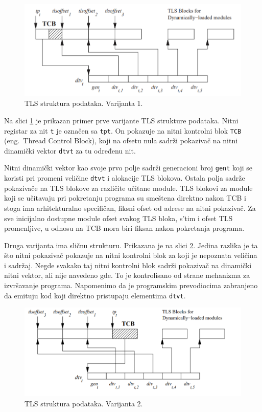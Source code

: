 \documentclass[12pt,oneside]{memoir}
\begin{document}
\begin{figure}[h!]
	\begin{center}
		\includegraphics[scale=0.6]{slike/TLSModelV1.png}
	\end{center}
	\caption{TLS struktura podataka. Varijanta 1.}
	\label{fig:tls_model1}
\end{figure}

Na slici \ref{fig:tls_model1} je prikazan primer prve varijante TLS strukture podataka. Nitni registar za nit \texttt{t} je označen sa \texttt{tpt}. On pokazuje na nitni kontrolni blok \texttt{TCB} (eng.~Thread Control Block), koji na ofsetu nula sadrži pokazivač na nitni dinamički vektor \texttt{dtvt} za tu određenu nit.

Nitni dinamički vektor kao svoje prvo polje sadrži generacioni broj \texttt{gent} koji se koristi pri promeni veličine \texttt{dtvt} i alokacije TLS blokova. Ostala polja sadrže pokazivače na TLS blokove za različite učitane module. TLS blokovi za module koji se učitavaju pri pokretanju programa su smeštena direktno nakon TCB i stoga ima arhitekturalno specifičan, fiksni ofset od adrese na nitni pokazivač. Za sve inicijalno dostupne module ofset svakog TLS bloka, s'tim i ofset TLS promenljive, u odnosu na TCB mora biri fiksan nakon pokretanja programa.

Druga varijanta ima sličnu strukturu. Prikazana je na slici \ref{fig:tls_model2}. Jedina razlika je ta što nitni pokazivač pokazuje na nitni kontrolni blok za koji je nepoznata veličina i sadržaj. Negde svakako taj nitni kontrolni blok sadrži pokazivač na dinamički nitni vektor, ali nije navedeno gde. To je kontrolisano od strane mehanizma za izvršavanje programa. Napomenimo da je programskim prevodiocima zabranjeno da emituju kod koji direktno pristupaju elementima \texttt{dtvt}.

\begin{figure}[h!]
	\begin{center}
		\includegraphics[scale=0.6]{slike/TLSmodelV2.png}
	\end{center}
	\caption{TLS struktura podataka. Varijanta 2.}
	\label{fig:tls_model2}
\end{figure}
\end{document}
